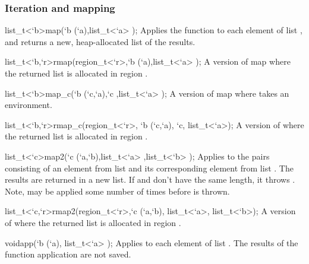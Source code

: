 \subsubsection*{Iteration and mapping}

\begin{defun2}{list_t<`b>}{map}{(`b (`a),list_t<`a> );}
  Applies the function  to each element of list , and
  returns a new, heap-allocated list of the results.
\end{defun2}

\begin{defun2}{list_t<`b,`r>}{rmap}{(region_t<`r>,`b (`a),list_t<`a> );}
  A version of map where the returned list is allocated in region
  .
\end{defun2}

\begin{defun2}{list_t<`b>}{map_c}{(`b (`c,`a),`c ,list_t<`a> );}
  A version of map where  takes an environment.
\end{defun2}

\begin{defun2}{list_t<`b,`r>}{rmap_c}{(region_t<`r>, `b (`c,`a), `c, list_t<`a>);}
  A version of  where the returned list is allocated in
  region .
\end{defun2}

\begin{defun2}{list_t<`c>}{map2}{(`c (`a,`b),list_t<`a> ,list_t<`b> );}
  Applies  to the pairs consisting of an element from list
   and its corresponding element from list .  The
  results are returned in a new list.  If  and  don't
  have the same length, it throws .  Note,
   may be applied some number of times before
   is thrown.
\end{defun2}

\begin{defun2}{list_t<`c,`r>}{rmap2}{(region_t<`r>,`c (`a,`b), list_t<`a>, list_t<`b>);}
  A version of  where the returned list is allocated in
  region .
\end{defun2}

\begin{defun2}{void}{app}{(`b (`a), list_t<`a> );}
  Applies  to each element of list .  The results of the
  function application are not saved.
\end{defun2}

